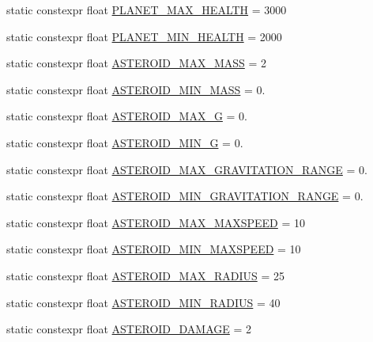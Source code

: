 \begin{DoxyCompactItemize}
\item 
static constexpr float \hyperlink{class_act_conf_a4a215bad506ce8e86dc852dcbf86f9d5}{P\+L\+A\+N\+E\+T\+\_\+\+M\+A\+X\+\_\+\+H\+E\+A\+L\+T\+H} = 3000
\item 
static constexpr float \hyperlink{class_act_conf_a504a597b45e34295411ab02fa8dd1f7c}{P\+L\+A\+N\+E\+T\+\_\+\+M\+I\+N\+\_\+\+H\+E\+A\+L\+T\+H} = 2000
\item 
static constexpr float \hyperlink{class_act_conf_ad1c3d70b0a1bdd675a92b760d2c77052}{A\+S\+T\+E\+R\+O\+I\+D\+\_\+\+M\+A\+X\+\_\+\+M\+A\+S\+S} = 2
\item 
static constexpr float \hyperlink{class_act_conf_abc1ef87db73f476117b031d6fdb26bb1}{A\+S\+T\+E\+R\+O\+I\+D\+\_\+\+M\+I\+N\+\_\+\+M\+A\+S\+S} = 0.
\item 
static constexpr float \hyperlink{class_act_conf_a2acb0a20eeff6fe949534d563d1ee4a0}{A\+S\+T\+E\+R\+O\+I\+D\+\_\+\+M\+A\+X\+\_\+\+G} = 0.
\item 
static constexpr float \hyperlink{class_act_conf_a8a3df593428f7bfe4275f363f7803b22}{A\+S\+T\+E\+R\+O\+I\+D\+\_\+\+M\+I\+N\+\_\+\+G} = 0.
\item 
static constexpr float \hyperlink{class_act_conf_a0cb633bae699f92e7a623528effd4518}{A\+S\+T\+E\+R\+O\+I\+D\+\_\+\+M\+A\+X\+\_\+\+G\+R\+A\+V\+I\+T\+A\+T\+I\+O\+N\+\_\+\+R\+A\+N\+G\+E} = 0.
\item 
static constexpr float \hyperlink{class_act_conf_a520a6ef7f9859a8b7a4e7b91caf92f44}{A\+S\+T\+E\+R\+O\+I\+D\+\_\+\+M\+I\+N\+\_\+\+G\+R\+A\+V\+I\+T\+A\+T\+I\+O\+N\+\_\+\+R\+A\+N\+G\+E} = 0.
\item 
static constexpr float \hyperlink{class_act_conf_a26178ed0d762ea78107b70e65478f4d8}{A\+S\+T\+E\+R\+O\+I\+D\+\_\+\+M\+A\+X\+\_\+\+M\+A\+X\+S\+P\+E\+E\+D} = 10
\item 
static constexpr float \hyperlink{class_act_conf_a13378c380b6c2e80528cc2be8886141f}{A\+S\+T\+E\+R\+O\+I\+D\+\_\+\+M\+I\+N\+\_\+\+M\+A\+X\+S\+P\+E\+E\+D} = 10
\item 
static constexpr float \hyperlink{class_act_conf_ad9366b1023af723b5d1a0c81c754bf67}{A\+S\+T\+E\+R\+O\+I\+D\+\_\+\+M\+A\+X\+\_\+\+R\+A\+D\+I\+U\+S} = 25
\item 
static constexpr float \hyperlink{class_act_conf_aec665c9f3c68ea5ecdf65c20f1e760d6}{A\+S\+T\+E\+R\+O\+I\+D\+\_\+\+M\+I\+N\+\_\+\+R\+A\+D\+I\+U\+S} = 40
\item 
static constexpr float \hyperlink{class_act_conf_a78ea393209b908b4c7fd59f8bcd9a276}{A\+S\+T\+E\+R\+O\+I\+D\+\_\+\+D\+A\+M\+A\+G\+E} = 2

\end{DoxyCompactItemize}
